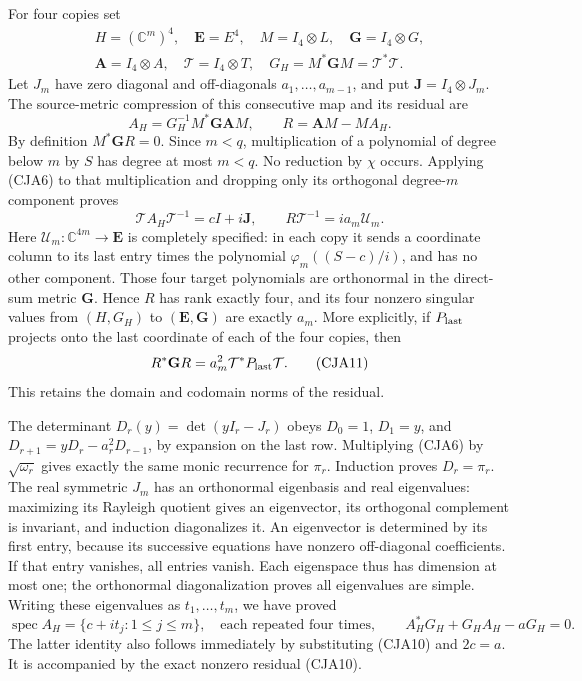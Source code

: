 \documentclass[11pt,a4paper]{article}
\begin{document}
For four copies set
\[
\begin{gathered}
 H=(\mathbb C^m)^4,\quad
 \mathbf E=E^4,\quad
 M=I_4\otimes L,\quad
 \mathbf G=I_4\otimes G,\\
 \mathbf A=I_4\otimes A,\quad
 \mathcal T=I_4\otimes T,\quad
 G_H=M^*\mathbf GM=\mathcal T^*\mathcal T.
\end{gathered}
\]
Let \(J_m\) have zero diagonal and off-diagonals
\(a_1,\ldots,a_{m-1}\), and put \(\mathbf J=I_4\otimes J_m\).
The source-metric compression of this consecutive map and its residual are
\begin{equation}
 A_H=G_H^{-1}M^*\mathbf G\mathbf AM,\qquad
 R=\mathbf AM-MA_H .
 \tag{CJA9}
\end{equation}
By definition \(M^*\mathbf GR=0\).
Since \(m<q\), multiplication of a polynomial of degree below \(m\)
by \(S\) has degree at most \(m<q\).  No reduction by \(\chi\)
occurs.  Applying (CJA6) to that multiplication and dropping only its
orthogonal degree-\(m\) component proves
\begin{equation}
 \boxed{\mathcal TA_H\mathcal T^{-1}=cI+i\mathbf J,\qquad
 R\mathcal T^{-1}=i a_m\mathcal U_m.}
 \tag{CJA10}
\end{equation}
Here \(\mathcal U_m:\mathbb C^{4m}\to\mathbf E\) is completely specified:
in each copy it sends a coordinate column to its last entry times the
polynomial \(\varphi_m((S-c)/i)\), and has no other component.
Those four target polynomials are orthonormal in the direct-sum
metric \(\mathbf G\).  Hence \(R\) has rank exactly four, and its four
nonzero singular values from \((H,G_H)\) to
\((\mathbf E,\mathbf G)\) are exactly \(a_m\).
More explicitly, if \(P_{\rm last}\) projects onto the last coordinate
of each of the four copies, then
\begin{equation}
 R^*\mathbf GR=a_m^2\mathcal T^*P_{\rm last}\mathcal T .
 \tag{CJA11}
\end{equation}
This retains the domain and codomain norms of the residual.

The determinant \(D_r(y)=\det(yI_r-J_r)\) obeys
\(D_0=1\), \(D_1=y\), and
\(D_{r+1}=yD_r-a_r^2D_{r-1}\), by expansion on the last row.
Multiplying (CJA6) by \(\sqrt{\omega_r}\) gives exactly the same
monic recurrence for \(\pi_r\).
Induction proves \(D_r=\pi_r\).
The real symmetric \(J_m\) has an orthonormal eigenbasis and real
eigenvalues: maximizing its Rayleigh quotient gives an eigenvector,
its orthogonal complement is invariant, and induction diagonalizes it.
An eigenvector is determined by its first entry, because its
successive equations have nonzero off-diagonal coefficients.
If that entry vanishes, all entries vanish.  Each eigenspace thus has
dimension at most one; the orthonormal diagonalization proves all
eigenvalues are simple.
Writing these eigenvalues as \(t_1,\ldots,t_m\), we have proved
\begin{equation}
 \operatorname{spec}A_H=\{c+it_j:1\leq j\leq m\},
 \quad\text{each repeated four times},\qquad
 A_H^*G_H+G_HA_H-aG_H=0.
 \tag{CJA12}
\end{equation}
The latter identity also follows immediately by substituting
(CJA10) and \(2c=a\).
It is accompanied by the exact nonzero residual (CJA10).
\end{document}
